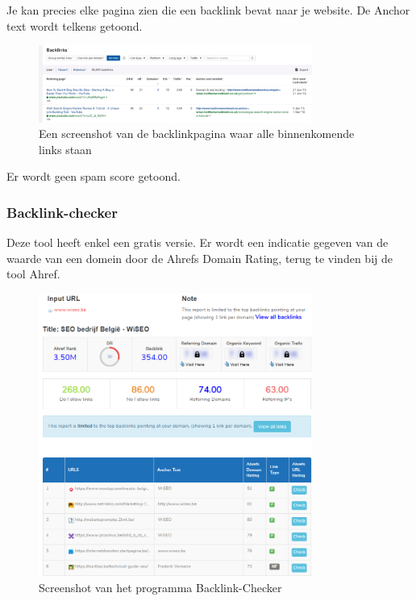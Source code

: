 Je kan precies elke pagina zien die een backlink bevat naar je website. De Anchor text wordt telkens getoond.

\begin{figure}[h!]
\centering
\includegraphics[width=0.8\textwidth]{img/ahrefsbacklink.PNG}
\caption{Een screenshot van de backlinkpagina waar alle binnenkomende links staan
\autocite{ahrefs}}
\end{figure}

Er wordt geen spam score getoond. 

\subsubsection{Backlink-checker}
\label{ch: Backlink-checker}

Deze tool heeft enkel een gratis versie. Er wordt een indicatie gegeven van de waarde van een domein door de Ahrefs Domain Rating, terug te vinden bij de tool Ahref.

\begin{figure}[h!]
\centering
\includegraphics[width=0.8\textwidth]{img/backlinkchecker.PNG}
\caption{Screenshot van het programma Backlink-Checker
\autocite{backlinkchecker}}
\end{figure}


